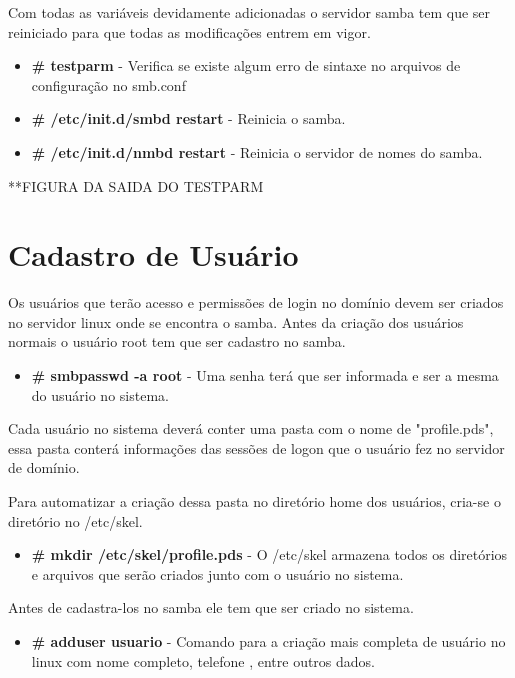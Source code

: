 Com todas as variáveis devidamente adicionadas o servidor samba tem que ser reiniciado para que todas as modificações entrem em vigor.

\begin{itemize}
	\item \textbf{\# testparm} - Verifica se existe algum erro de sintaxe no arquivos de configuração no smb.conf
	\item \textbf{\# /etc/init.d/smbd restart} - Reinicia o samba.
	\item \textbf{\# /etc/init.d/nmbd restart} - Reinicia o servidor de nomes do samba.
\end{itemize}

**FIGURA DA SAIDA DO TESTPARM

\section{Cadastro de Usuário}

Os usuários que terão acesso e permissões de login no domínio devem ser criados no servidor linux onde se encontra o samba. Antes da criação dos usuários normais o usuário root tem que ser cadastro no samba.

\begin{itemize}
	\item \textbf {\# smbpasswd -a root} - Uma senha terá que ser informada e ser a mesma do usuário no sistema.
\end{itemize}

Cada usuário no sistema deverá conter uma pasta com o nome de "profile.pds", essa pasta conterá informações das sessões de logon que o usuário fez no servidor de domínio.

Para automatizar a criação dessa pasta no diretório home dos usuários, cria-se o diretório no /etc/skel.

\begin{itemize}
	\item \textbf{\# mkdir /etc/skel/profile.pds} - O /etc/skel armazena todos os diretórios e arquivos que serão criados junto com o usuário no sistema.
\end{itemize}

Antes de cadastra-los no samba ele tem que ser criado no sistema.

\begin{itemize}
	\item \textbf{\# adduser usuario} - Comando para a criação mais completa de usuário no linux com nome completo, telefone , entre outros dados.
\end{itemize}

